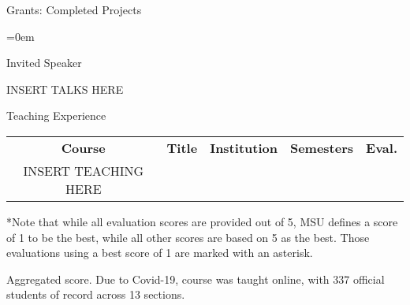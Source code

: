\documentclass{resume} %
\begin{document}
\begin{rSection}{Grants: Completed Projects}
\begin{itemize}{}{\leftmargin=0em}

\end{itemize}
\vspace{-.1in}

\end{rSection}


%
\begin{rSection}{Invited Speaker}

INSERT TALKS HERE

\end{rSection}


%

\newpage
\begin{rSection}{Teaching Experience}

\begin{tabular}{cLccc}
\textbf{Course} & \textbf{Title} & \textbf{Institution} & \textbf{Semesters}& \textbf{Eval.}\\
\hline
INSERT TEACHING HERE
\end{tabular}

*Note that while all evaluation scores are provided out of 5, MSU defines a score of 1 to be the best, while all other scores are based on 5 as the best.
Those evaluations using a best score of 1 are marked with an asterisk.

\textdagger Aggregated score.  Due to Covid-19, course was taught online, with 337 official students of record across 13 sections.



\end{rSection}


\end{document}
